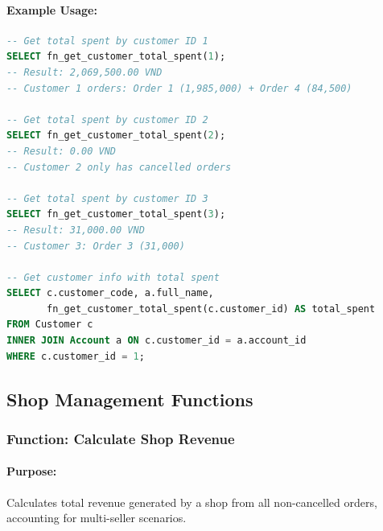 \paragraph{Example Usage:}

\begin{lstlisting}[language=SQL]
-- Get total spent by customer ID 1
SELECT fn_get_customer_total_spent(1);
-- Result: 2,069,500.00 VND
-- Customer 1 orders: Order 1 (1,985,000) + Order 4 (84,500)

-- Get total spent by customer ID 2
SELECT fn_get_customer_total_spent(2);
-- Result: 0.00 VND
-- Customer 2 only has cancelled orders

-- Get total spent by customer ID 3
SELECT fn_get_customer_total_spent(3);
-- Result: 31,000.00 VND
-- Customer 3: Order 3 (31,000)

-- Get customer info with total spent
SELECT c.customer_code, a.full_name, 
       fn_get_customer_total_spent(c.customer_id) AS total_spent
FROM Customer c
INNER JOIN Account a ON c.customer_id = a.account_id
WHERE c.customer_id = 1;
\end{lstlisting}

\subsection{Shop Management Functions}

\subsubsection{Function: Calculate Shop Revenue}

\paragraph{Purpose:} Calculates total revenue generated by a shop from all non-cancelled orders, accounting for multi-seller scenarios.

